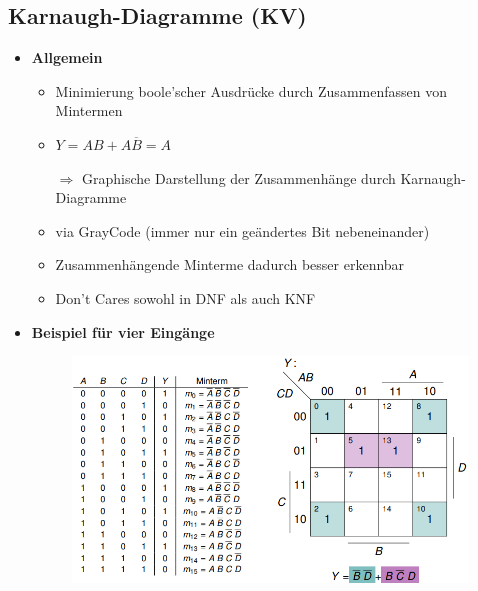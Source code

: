 \documentclass[11pt,a4paper]{article}
\begin{document}
\subsection{Karnaugh-Diagramme (KV)}
\begin{itemize}

\item \textbf{Allgemein}
	\begin{itemize}
	\item Minimierung boole'scher Ausdrücke durch Zusammenfassen von Mintermen
	\item $Y = AB +A\overline{B}= A$
	\item[$\Rightarrow$] Graphische Darstellung der Zusammenhänge durch Karnaugh-Diagramme
	\item via GrayCode (immer nur ein geändertes Bit nebeneinander)
	\item Zusammenhängende Minterme dadurch besser erkennbar
	\item Don't Cares sowohl in DNF als auch KNF
	\end{itemize}

\item \textbf{Beispiel für vier Eingänge}
	\item[] \begin{figure}[H]
				\begin{center}
				\includegraphics[height=6cm]{karnaugh4}
				\end{center}
			\end{figure}
			

\end{itemize}
\end{document}
